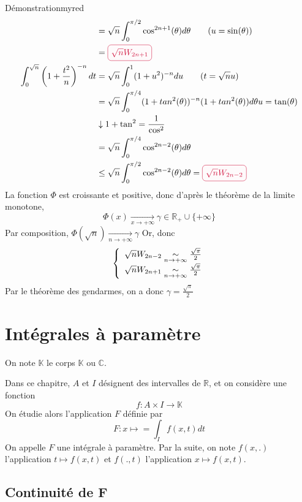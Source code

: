 \begin{demo}{Démonstration}{myred}
\begin{align*}
            &= \sqrt{n} \int_{0}^{\pi / 2} \cos^{2n+1}(\theta) d\theta  \qquad (u = \sin(\theta)) \\
            &= \lilbox{myred}{$\sqrt{n} W_{2n+1}$} \\
            \int_{0}^{\sqrt{n}} \left(1 + \frac{t^2}{n}\right)^{-n} dt &= \sqrt{n} \int_{0}^{1} (1 + u^2)^{-n} du \qquad (t = \sqrt{n} u) \\
            &= \sqrt{n} \int_{0}^{\pi / 4} (1 + tan^2(\theta))^{-n} (1 + tan^2(\theta)) d\theta \hfill u = \tan(\theta) \\
            &\downarrow 1 + \tan^2 = \frac{1}{\cos^2} \\
            & = \sqrt{n} \int_{0}^{\pi / 4} \cos^{2n-2}(\theta)d\theta \\
            &\leq \sqrt{n} \int_{0}^{\pi / 2} \cos^{2n-2}(\theta)d\theta = \lilbox{myred}{$\sqrt{n}W_{2n-2}$}
        \end{align*}
        La fonction $\Phi$ est croissante et positive, donc d’après le théorème de la limite monotone, \[ \Phi(x) \underset{x \rightarrow + \infty}{\longrightarrow} \gamma \in \mathbb{R}_+ \cup \{ + \infty \} \] 
        Par composition, $\Phi (\sqrt{n}) \underset{n \rightarrow + \infty}{\longrightarrow} \gamma$
        \newline
        Or,  donc \[ \et{\sqrt{n} W_{2n-2} \underset{n \rightarrow + \infty}{\sim} \frac{\sqrt{\pi}}{2}}{\sqrt{n} W_{2n+1} \underset{n \rightarrow + \infty}{\sim} \frac{\sqrt{\pi}}{2}} \] 
        Par le théorème des gendarmes, on a donc $\gamma = \frac{\sqrt{\pi}}{2}$
    \end{demo}

\newpage

\section{Intégrales à paramètre}

On note $\mathbb{K}$ le corps $\mathbb{K}$ ou $\mathbb{C}$.

Dans ce chapitre, $A$ et $I$ désignent des intervalles de $\mathbb{R}$, et on considère une fonction 
\[ f : A \times I \to \mathbb{K} \]   
On étudie alors l’application $F$ définie par 
\[ F : x \longmapsto = \int_I f(x,t) dt \]   
On appelle $F$ une intégrale à paramètre. Par la suite, on note $f(x,.)$ l’application $t \mapsto f(x,t)$ et $f(.,t)$ l’application $x \mapsto f(x,t)$.

\subsection{Continuité de F}

